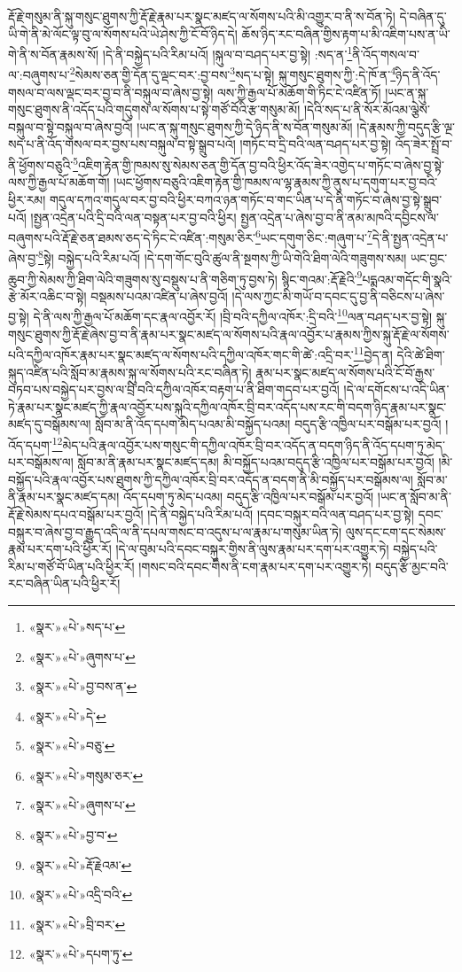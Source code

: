 རྡོ་རྗེ་གསུམ་ནི་སྐུ་གསུང་ཐུགས་ཀྱི་རྡོ་རྗེ་རྣམ་པར་སྣང་མཛད་ལ་སོགས་པའི་མི་འགྱུར་བ་ནི་ས་བོན་ཏེ། དེ་བཞིན་དུ་ཡི་གེ་ནི་མེ་ལོང་ལྟ་བུ་ལ་སོགས་པའི་ཡེ་ཤེས་ཀྱི་ངོ་བོ་ཉིད་དེ། ཆོས་ཉིད་རང་བཞིན་གྱིས་རྟག་པ་མི་འཇིག་པས་ན་ཡི་གེ་ནི་ས་བོན་རྣམས་སོ། །དེ་ནི་བསྐྱེད་པའི་རིམ་པའོ། །སྐུལ་བ་བཤད་པར་བྱ་སྟེ། :སད་ན་\footnote{«སྣར་»«པེ་»སད་པ་}ནི་འོད་གསལ་བ་ལ་:བཞུགས་པ་\footnote{«སྣར་»«པེ་»ཞུགས་པ་}སེམས་ཅན་གྱི་དོན་དུ་ལྡང་བར་:བྱ་བས་\footnote{«སྣར་»«པེ་»བྱ་བས་ན་}སད་པ་སྟེ། སྐུ་གསུང་ཐུགས་ཀྱི་:དེ་ཁོ་ན་\footnote{«སྣར་»«པེ་»དེ་}ཉིད་ནི་འོད་གསལ་བ་ལས་ལྡང་བར་བྱ་བ་ནི་བསྐུལ་བ་ཞེས་བྱ་སྟེ། ལས་ཀྱི་རྒྱལ་པོ་མཆོག་གི་ཏིང་ངེ་འཛིན་ཏོ། །ཡང་ན་སྐུ་གསུང་ཐུགས་ནི་འདོད་པའི་གདུགས་ལ་སོགས་པ་སྟེ་གཙོ་བོའི་རྩ་གསུམ་མོ། །དེའི་སད་པ་ནི་སོར་མོའམ་ལྕེས་བསྐུལ་བ་སྟེ་བསྐུལ་བ་ཞེས་བྱའོ། །ཡང་ན་སྐུ་གསུང་ཐུགས་ཀྱི་དེ་ཉིད་ནི་ས་བོན་གསུམ་མོ། །དེ་རྣམས་ཀྱི་བདུད་རྩི་ལྔ་སད་པ་ནི་འོད་གསལ་བར་བྱས་པས་བསྐུལ་བ་སྟེ་སྒྲུབ་པའོ། །གཏོང་བ་དྲི་བའི་ལན་བཤད་པར་བྱ་སྟེ། འོད་ཟེར་སྤྲོ་བ་ནི་ཕྱོགས་བཅུའི་\footnote{«སྣར་»«པེ་»བཅུ་}འཇིག་རྟེན་གྱི་ཁམས་སུ་སེམས་ཅན་གྱི་དོན་བྱ་བའི་ཕྱིར་འོད་ཟེར་འགྱེད་པ་གཏོང་བ་ཞེས་བྱ་སྟེ་ལས་ཀྱི་རྒྱལ་པོ་མཆོག་གོ། །ཡང་ཕྱོགས་བཅུའི་འཇིག་རྟེན་གྱི་ཁམས་ལ་ལྷ་རྣམས་ཀྱི་ནུས་པ་དགུག་པར་བྱ་བའི་ཕྱིར་རམ། གདུལ་དཀའ་གདུལ་བར་བྱ་བའི་ཕྱིར་བཀའ་ཉན་གཏོང་བ་གང་ཡིན་པ་དེ་ནི་གཏོང་བ་ཞེས་བྱ་སྟེ་སྒྲུབ་པའོ། །སྤྱན་འདྲེན་པའི་དྲི་བའི་ལན་བསྟན་པར་བྱ་བའི་ཕྱིར། སྤྱན་འདྲེན་པ་ཞེས་བྱ་བ་ནི་ནམ་མཁའི་དབྱིངས་ལ་བཞུགས་པའི་རྡོ་རྗེ་ཅན་ཐམས་ཅད་དེ་ཏིང་ངེ་འཛིན་:གསུམ་ཅིར་\footnote{«སྣར་»«པེ་»གསུམ་ཅར་}ཡང་དགུག་ཅིང་:གཞུག་པ་\footnote{«སྣར་»«པེ་»ཞུགས་པ་}དེ་ནི་སྤྱན་འདྲེན་པ་ཞེས་བྱ་\footnote{«སྣར་»«པེ་»བྱ་བ་}སྟེ། བསྐྱེད་པའི་རིམ་པའོ། །དེ་དག་གོང་བུའི་ཚུལ་ནི་སྔགས་ཀྱི་ཡི་གེའི་ཐིག་ལེའི་གཟུགས་སམ། ཡང་བྱང་ཆུབ་ཀྱི་སེམས་ཀྱི་ཐིག་ལེའི་གཟུགས་སུ་བསྡུས་པ་ནི་གཅིག་ཏུ་བྱས་ཏེ། སྙིང་གའམ་:རྡོ་རྗེའི་\footnote{«སྣར་»«པེ་»རྡོ་རྗེའམ་}པདྨའམ་གདོང་གི་སྣའི་རྩེ་མོར་འཆིང་བ་སྟེ། བསྡམས་པའམ་འཛིན་པ་ཞེས་བྱའོ། །དེ་ལས་ཀྱང་མི་གཡོ་བ་དབང་དུ་བྱ་ནི་བཅིངས་པ་ཞེས་བྱ་སྟེ། དེ་ནི་ལས་ཀྱི་རྒྱལ་པོ་མཆོག་དང་རྣལ་འབྱོར་རོ། །བྲི་བའི་དཀྱིལ་འཁོར་:དྲི་བའི་\footnote{«སྣར་»«པེ་»འདྲི་བའི་}ལན་བཤད་པར་བྱ་སྟེ། སྐུ་གསུང་ཐུགས་ཀྱི་རྡོ་རྗེ་ཞེས་བྱ་བ་ནི་རྣམ་པར་སྣང་མཛད་ལ་སོགས་པའི་རྣལ་འབྱོར་པ་རྣམས་ཀྱིས་སྐུ་རྡོ་རྗེ་ལ་སོགས་པའི་དཀྱིལ་འཁོར་རྣམ་པར་སྣང་མཛད་ལ་སོགས་པའི་དཀྱིལ་འཁོར་གང་གི་ཚེ་:འདྲི་བར་\footnote{«སྣར་»«པེ་»བྲི་བར་}བྱེད་ན། དེའི་ཚེ་ཐིག་སྐུད་འཛིན་པའི་སློབ་མ་རྣམས་སྐུ་ལ་སོགས་པའི་རང་བཞིན་ཏེ། རྣམ་པར་སྣང་མཛད་ལ་སོགས་པའི་ངོ་བོ་རྒྱས་བཏབ་པས་བསྐྱེད་པར་བྱས་ལ་བྲི་བའི་དཀྱིལ་འཁོར་བརྟག་པ་ནི་ཐིག་གདབ་པར་བྱའོ། །དེ་ལ་དགོངས་པ་འདི་ཡིན་ཏེ་རྣམ་པར་སྣང་མཛད་ཀྱི་རྣལ་འབྱོར་པས་སྐུའི་དཀྱིལ་འཁོར་བྲི་བར་འདོད་པས་རང་གི་བདག་ཉིད་རྣམ་པར་སྣང་མཛད་དུ་བསྒོམས་ལ། སློབ་མ་ནི་འོད་དཔག་མེད་པའམ་མི་བསྐྱོད་པའམ། བདུད་རྩི་འཁྱིལ་པར་བསྒོམ་པར་བྱའོ། །འོད་དཔག་\footnote{«སྣར་»«པེ་»དཔག་ཏུ་}མེད་པའི་རྣལ་འབྱོར་པས་གསུང་གི་དཀྱིལ་འཁོར་བྲི་བར་འདོད་ན་བདག་ཉིད་ནི་འོད་དཔག་ཏུ་མེད་པར་བསྒོམས་ལ། སློབ་མ་ནི་རྣམ་པར་སྣང་མཛད་དམ། མི་བསྐྱོད་པའམ་བདུད་རྩི་འཁྱིལ་པར་བསྒོམ་པར་བྱའོ། །མི་བསྐྱོད་པའི་རྣལ་འབྱོར་པས་ཐུགས་ཀྱི་དཀྱིལ་འཁོར་བྲི་བར་འདོད་ན་བདག་ནི་མི་བསྐྱོད་པར་བསྒོམས་ལ། སློབ་མ་ནི་རྣམ་པར་སྣང་མཛད་དམ། འོད་དཔག་ཏུ་མེད་པའམ། བདུད་རྩི་འཁྱིལ་པར་བསྒོམ་པར་བྱའོ། །ཡང་ན་སློབ་མ་ནི་རྡོ་རྗེ་སེམས་དཔའ་བསྒོམ་པར་བྱའོ། །དེ་ནི་བསྐྱེད་པའི་རིམ་པའོ། །དབང་བསྐུར་བའི་ལན་བཤད་པར་བྱ་སྟེ། དབང་བསྐུར་བ་ཞེས་བྱ་བ་རྒྱུད་འདི་ལ་ནི་དཔལ་གསང་བ་འདུས་པ་ལ་རྣམ་པ་གསུམ་ཡིན་ཏེ། ལུས་དང་ངག་དང་སེམས་རྣམ་པར་དག་པའི་ཕྱིར་རོ། །དེ་ལ་བུམ་པའི་དབང་བསྐུར་གྱིས་ནི་ལུས་རྣམ་པར་དག་པར་འགྱུར་ཏེ། བསྐྱེད་པའི་རིམ་པ་གཙོ་བོ་ཡིན་པའི་ཕྱིར་རོ། །གསང་བའི་དབང་གིས་ནི་ངག་རྣམ་པར་དག་པར་འགྱུར་ཏེ། བདུད་རྩི་མྱང་བའི་རང་བཞིན་ཡིན་པའི་ཕྱིར་རོ། 